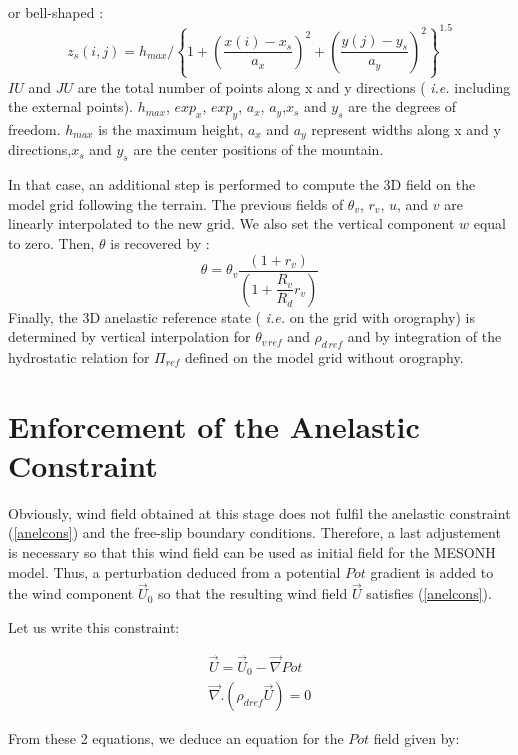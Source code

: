 or bell-shaped :
$$
z_{s}(i,j) = h_{max} / \left\{ 1 + \left(\dfrac{x(i) - x_{s}}{a_{x}}\right)^{2}
+ \left(\dfrac{y(j) - y_{s}}{a_{y}}\right)^{2}
\right\}^{1.5}
$$
$IU$ and $JU$ are the total number of points along x and y directions (
{\it i.e.}
including the external points). $h_{max}$, $exp_{x}$, $exp_{y}$, $a_{x}$,
$a_{y}$,$x_{s}$ and $y_{s}$ are the  degrees of freedom. $h_{max}$ is the maximum
height, $a_{x}$ and
$a_{y}$ represent widths along x and y directions,$x_{s}$ and $y_{s}$  are
the center
positions of the mountain.

In that case, an additional step is performed
to compute the 3D field on the model grid following the terrain.
The previous fields of $\theta_v$, $r_v$, $u$, and $v$
are linearly interpolated to the new grid. We also set the vertical component
$w$ equal to zero.
Then, $\theta$ is recovered by :
\begin{equation}
\theta = \theta_{v}\dfrac{(1+r_{v})}{(1 + \dfrac{R_{v}}{R_{d}}r_{v})}
\end{equation}
Finally, the  3D anelastic reference state (
{\it i.e.} on the grid with orography) is determined
 by vertical interpolation for  $\theta_{v\,ref}$ and
$\rho_{d\,ref}$ and by integration of the hydrostatic relation for
$\Pi_{ref}$
defined on the model grid without  orography.

\section{Enforcement of the Anelastic Constraint}

Obviously, wind field obtained at this stage does not fulfil the anelastic
constraint (\ref{anelcons}) and the
free-slip boundary conditions. Therefore, a
last adjustement is necessary so that this wind field can be used as initial
field for the MESONH model. Thus, a perturbation deduced from a potential $Pot$
gradient  is added to the wind component $\vec{U}_0$ so that the resulting
 wind field $\vec{U}$  satisfies (\ref{anelcons}).

Let us write this constraint:

\begin{eqnarray}
\vec{U} = \vec{U} _0 - \vec {\nabla } Pot  \nonumber \\
\vec { \nabla } . \left( \rho _{dref}  \vec{U}  \right) = 0 \nonumber
\end{eqnarray}

From these 2 equations, we deduce an equation for the $Pot$ field given by:

